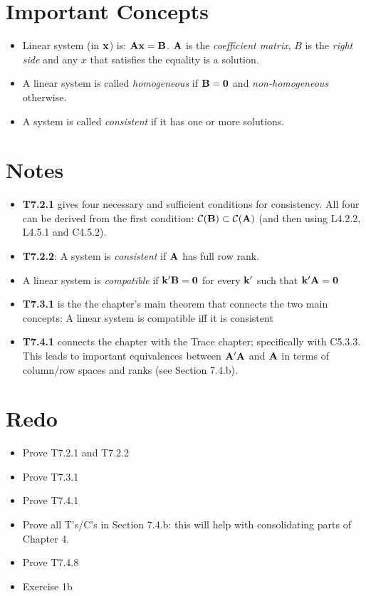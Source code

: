 \documentclass[a4paper, oneside]{book}
\begin{document}
\section*{Important Concepts}
\begin{itemize}
\item Linear system (in $\mathbf{x}$) is: $\mathbf{Ax=B}$. $\mathbf A$ is the \textit{coefficient matrix}, $B$ is the \textit{right side} and any $x$ that satisfies the equality is a solution. 
\item A linear system is called \textit{homogeneous} if $\mathbf{B=0}$ and \textit{non-homogeneous} otherwise.
\item A system is called \textit{consistent} if it has one or more solutions.
\end{itemize}

\section*{Notes}
\begin{itemize}
\item \textbf{T7.2.1} gives four necessary and sufficient conditions for consistency. All four can be derived from the first condition: $\mathcal{C}(\mathbf{B}) \subset \mathcal{C}(\mathbf{A})$ (and then using L4.2.2, L4.5.1 and C4.5.2).
\item \textbf{T7.2.2}: A system is \textit{consistent} if $\mathbf{A}$ has full row rank.
\item A linear system is \textit{compatible} if $\mathbf{k'B=0}$ for every $\mathbf k'$ such that $\mathbf{k'A=0}$
\item \textbf{T7.3.1} is the the chapter's main theorem that connects the two main concepts: A linear system is compatible iff it is consistent
\item \textbf{T7.4.1} connects the chapter with the Trace chapter; specifically with C5.3.3. This leads to important equivalences between $\mathbf{A'A}$ and $\mathbf A$ in terms of column/row spaces and ranks (see Section 7.4.b).
\end{itemize}


\section*{Redo}
\begin{itemize}
\item Prove T7.2.1 and T7.2.2
\item Prove T7.3.1
\item Prove T7.4.1
\item Prove all T's/C's in Section 7.4.b: this will help with consolidating parts of Chapter 4.
\item Prove T7.4.8
\item Exercise 1b
\end{itemize}
\end{document}
